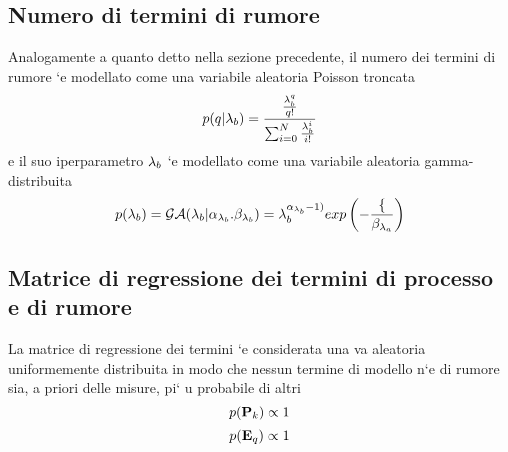  \subsection*{Numero di termini di rumore}
 Analogamente a quanto detto nella sezione precedente, il numero dei termini di
rumore `e modellato come una variabile aleatoria Poisson troncata
\begin{equation}
p(q|\lambda_b)=\frac{\frac{\lambda_b^q}{q!}}{\sum_{i=0}^N\frac{\lambda_b^i}{i!}}
\end{equation}
e il suo iperparametro $\lambda_b$ `e modellato come una variabile aleatoria gamma-distribuita
\begin{equation}
p(\lambda_b)=\mathcal{G}\mathcal{A}(\lambda_b|\alpha_{\lambda_b}.\beta_{\lambda_b})=\lambda_b^{\alpha_{\lambda_b}-1)}exp\left(-\frac{\lbrace}{\beta_{\lambda_a}}\right)
\end{equation}
\subsection*{Matrice di regressione dei termini di processo e di
rumore}
La matrice di regressione dei termini `e considerata una va aleatoria uniformemente
distribuita in modo che nessun termine di modello n`e di rumore sia, a priori delle
misure, pi`
u probabile di altri
\begin{equation}
p(\textbf{P}_k)\propto 1
\end{equation}
\begin{equation}
p(\textbf{E}_q )\propto 1
\end{equation}